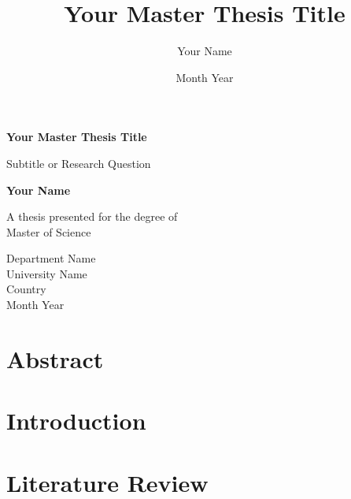 \documentclass[12pt]{report}
\title{Your Master Thesis Title}
\author{Your Name}
\date{Month Year}
\begin{document}
\begin{titlepage}
    \begin{center}
        \vspace*{1cm}
        
        \Huge
        \textbf{Your Master Thesis Title}
        
        \vspace{0.5cm}
        \LARGE
        Subtitle or Research Question
        
        \vspace{1.5cm}
        
        \textbf{Your Name}
        
        \vfill
        
        A thesis presented for the degree of\\
        Master of Science
        
        \vspace{0.8cm}
        

        
        \Large
        Department Name\\
        University Name\\
        Country\\
        Month Year
        
    \end{center}
\end{titlepage}


\chapter*{Abstract}

\clearpage
{}

\chapter{Introduction}
\label{chapter:introduction}

\chapter{Literature Review}
\label{chapter:literature_review}
\end{document}
